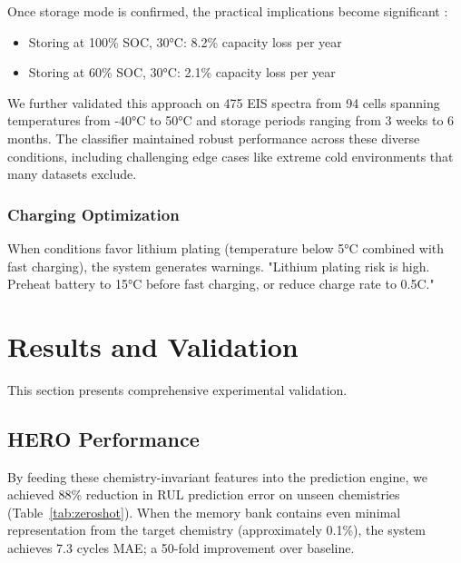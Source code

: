 \documentclass[5p,times,authoryear]{elsarticle}
\begin{document}
Once storage mode is confirmed, the practical implications become significant \citep{schimpe2018comprehensive, ecker2014calendar}:
\begin{itemize}
    \item Storing at 100\% SOC, 30°C: 8.2\% capacity loss per year
    \item Storing at 60\% SOC, 30°C: 2.1\% capacity loss per year
\end{itemize}

We further validated this approach on 475 EIS spectra from 94 cells spanning temperatures from -40°C to 50°C and storage periods ranging from 3 weeks to 6 months. The classifier maintained robust performance across these diverse conditions, including challenging edge cases like extreme cold environments that many datasets exclude.




\subsubsection{Charging Optimization}

When conditions favor lithium plating (temperature below 5°C combined with fast charging), the system generates warnings. "Lithium plating risk is high. Preheat battery to 15°C before fast charging, or reduce charge rate to 0.5C."




\clearpage
\section{Results and Validation}

This section presents comprehensive experimental validation.

\subsection{HERO Performance}

By feeding these chemistry-invariant features into the prediction engine, we achieved 88\% reduction in RUL prediction error on unseen chemistries (Table~\ref{tab:zeroshot}). When the memory bank contains even minimal representation from the target chemistry (approximately 0.1\%), the system achieves 7.3 cycles MAE; a 50-fold improvement over baseline.
\end{document}
